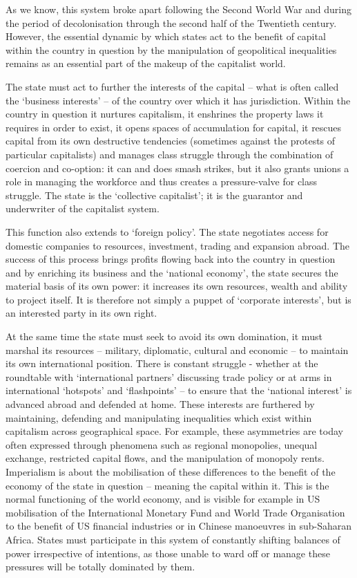 As we know, this system broke apart following the Second World War and during the period of decolonisation through the second half of the Twentieth century. However, the essential dynamic by which states act to the benefit of capital within the country in question by the manipulation of geopolitical inequalities remains as an essential part of the makeup of the capitalist world.

The state must act to further the interests of the capital – what is often called the ‘business interests’ – of the country over which it has jurisdiction. Within the country in question it nurtures capitalism, it enshrines the property laws it requires in order to exist, it opens spaces of accumulation for capital, it rescues capital from its own destructive tendencies (sometimes against the protests of particular capitalists) and manages class struggle through the combination of coercion and co-option: it can and does smash strikes, but it also grants unions a role in managing the workforce and thus creates a pressure-valve for class struggle. The state is the ‘collective capitalist’; it is the guarantor and underwriter of the capitalist system.

This function also extends to ‘foreign policy’. The state negotiates access for domestic companies to resources, investment, trading and expansion abroad. The success of this process brings profits flowing back into the country in question and by enriching its business and the ‘national economy’, the state secures the material basis of its own power: it increases its own resources, wealth and ability to project itself. It is therefore not simply a puppet of ‘corporate interests’, but is an interested party in its own right.

At the same time the state must seek to avoid its own domination, it must marshal its resources – military, diplomatic, cultural and economic – to maintain its own international position. There is constant struggle - whether at the roundtable with ‘international partners’ discussing trade policy or at arms in international ‘hotspots’ and ‘flashpoints’ – to ensure that the ‘national interest’ is advanced abroad and defended at home. These interests are furthered by maintaining, defending and manipulating inequalities which exist within capitalism across geographical space. For example, these asymmetries are today often expressed through phenomena such as regional monopolies, unequal exchange, restricted capital flows, and the manipulation of monopoly rents. Imperialism is about the mobilisation of these differences to the benefit of the economy of the state in question – meaning the capital within it. This is the normal functioning of the world economy, and is visible for example in US mobilisation of the International Monetary Fund and World Trade Organisation to the benefit of US financial industries or in Chinese manoeuvres in sub-Saharan Africa. States must participate in this system of constantly shifting balances of power irrespective of intentions, as those unable to ward off or manage these pressures will be totally dominated by them.

